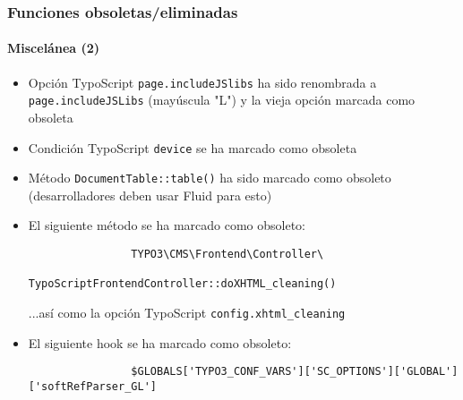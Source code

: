 \begin{frame}[fragile]
	\frametitle{Funciones obsoletas/eliminadas}
	\framesubtitle{Miscelánea (2)}

	\begin{itemize}
		\item Opción TypoScript \texttt{page.includeJSlibs} ha sido renombrada a\newline
			\texttt{page.includeJSLibs} (mayúscula "L") y la vieja opción marcada como obsoleta

		\item Condición TypoScript \texttt{device} se ha marcado como obsoleta

		\item Método \texttt{DocumentTable::table()} ha sido marcado como obsoleto\newline
			\small(desarrolladores deben usar Fluid para esto)\normalsize

		\item El siguiente método se ha marcado como obsoleto:
			\begin{lstlisting}
				TYPO3\CMS\Frontend\Controller\
				    TypoScriptFrontendController::doXHTML_cleaning()
			\end{lstlisting}
			...así como la opción TypoScript
			\small
				\texttt{config.xhtml\_cleaning}
			\normalsize

		\item El siguiente hook se ha marcado como obsoleto:
			\begin{lstlisting}
				$GLOBALS['TYPO3_CONF_VARS']['SC_OPTIONS']['GLOBAL']['softRefParser_GL']
			\end{lstlisting}
 
	\end{itemize}

\end{frame}


